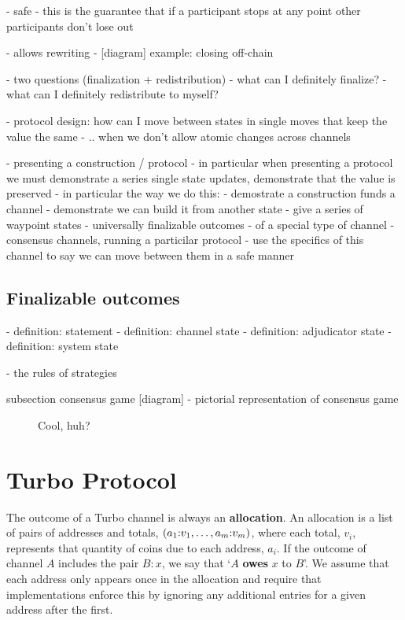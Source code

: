 \documentclass{article}
\begin{document}
- safe
- this is the guarantee that if a participant stops at any point other participants don't lose out

- allows rewriting
- [diagram] example: closing off-chain

- two questions (finalization + redistribution)
  - what can I definitely finalize?
  - what can I definitely redistribute to myself?

- protocol design: how can I move between states in single moves that keep the value the same
- .. when we don't allow atomic changes across channels

- presenting a construction / protocol
- in particular when presenting a protocol we must demonstrate a series single state updates, demonstrate that the value is preserved
- in particular the way we do this:
  - demostrate a construction funds a channel
  - demonstrate we can build it from another state
    - give a series of waypoint states - universally finalizable outcomes
    - of a special type of channel - consensus channels, running a particilar protocol
    - use the specifics of this channel to say we can move between them in a safe manner


\subsection{Finalizable outcomes}

- definition: statement
- definition: channel state
- definition: adjudicator state
- definition: system state

- the rules of strategies

subsection consensus game
[diagram] - pictorial representation of consensus game

\begin{figure}[h]\centering
  \makebox[\textwidth][c]{}
  \caption{Cool, huh?}
\end{figure}


\section{Turbo Protocol}

The outcome of a Turbo channel is always an \textbf{allocation}.
An allocation is a list of pairs of addresses and totals, $( a_1{:}v_1, \dots, a_m{:}v_m )$, where each total, $v_i$, represents that quantity of coins due to each address, $a_i$.
If the outcome of channel $A$ includes the pair $B{:}x$, we say that `$A$ \textbf{owes} $x$ to $B$'.
We assume that each address only appears once in the allocation and require that implementations enforce this by ignoring any additional entries for a given address after the first.
\end{document}
